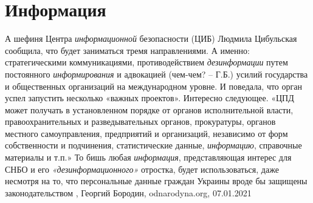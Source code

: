  
 
 
 
 
\chapter{Информация}

А  шефиня Центра \emph{информационной} безопасности (ЦИБ) Людмила Цибульская
сообщила, что будет заниматься тремя направлениями. А именно: стратегическими
коммуникациями, противодействием \emph{дезинформации} путем постоянного
\emph{информирования} и адвокацией (чем-чем? – Г.Б.) усилий государства и
общественных организаций на международном уровне. И поведала, что орган успел
запустить несколько «важных проектов».  Интересно следующее. «ЦПД может
получать в установленном порядке от органов исполнительной власти,
правоохранительных и разведывательных органов, прокуратуры, органов местного
самоуправления, предприятий и организаций, независимо от форм собственности и
подчинения, статистические данные, \emph{информацию}, справочные материалы и
т.п.» То бишь любая \emph{информация}, представляющая интерес для СНБО и его
\emph{«дезинформационного»} отростка, будет использоваться, даже несмотря на
то, что персональные данные граждан Украины вроде бы защищены законодательством
, Георгий Бородин, odnarodyna.org, 07.01.2021


